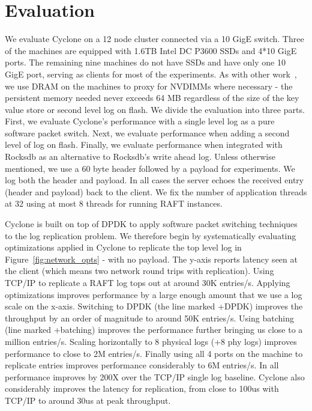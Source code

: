 \documentclass[10pt, preprint, nonatbib]{sigplanconf}
\begin{document}
\section{Evaluation}
\label{sec:evaluation}
We evaluate Cyclone on a 12 node cluster connected via a 10 GigE switch. Three
of the machines are equipped with 1.6TB Intel DC P3600 SSDs and 4*10 GigE
ports. The remaining nine machines do not have SSDs and have only one 10 GigE
port, serving as clients for most of the experiments. As with other
work~\cite{faast}, we use DRAM on the machines to proxy for NVDIMMs where
necessary - the persistent memory needed never exceeds 64 MB regardless of the
size of the key value store or second level log on flash. We divide the
evaluation into three parts. First, we evaluate Cyclone's performance with a
single level log as a pure software packet switch. Next, we evaluate performance
when adding a second level of log on flash. Finally, we evaluate performance
when integrated with Rocksdb as an alternative to Rocksdb's write ahead
log. Unless otherwise mentioned, we use a 60 byte header followed by a payload
for experiments. We log both the header and payload. In all cases the server
echoes the received entry (header and payload) back to the client. We fix the
number of application threads at 32 using at most 8 threads for running RAFT
instances.

Cyclone is built on top of DPDK to apply software packet switching techniques to
the log replication problem. We therefore begin by systematically evaluating
optimizations applied in Cyclone to replicate the top level log in
Figure~\ref{fig:network_opts} - with no payload. The y-axis reports latency seen
at the client (which means two network round trips with replication). Using
TCP/IP to replicate a RAFT log tops out at around 30K entries/s. Applying
optimizations improves performance by a large enough amount that we use a log
scale on the x-axis. Switching to DPDK (the line marked +DPDK) improves the
throughput by an order of magnitude to around 50K entries/s. Using batching
(line marked +batching) improves the performance further bringing us close to a
million entries/s. Scaling horizontally to 8 physical logs (+8 phy logs)
improves performance to close to 2M entries/s. Finally using all 4 ports on the
machine to replicate entries improves performance considerably to 6M
entries/s. In all performance improves by 200X over the TCP/IP single log
baseline. Cyclone also considerably improves the latency for replication, from
close to 100us with TCP/IP to around 30us at peak throughput.
\end{document}
